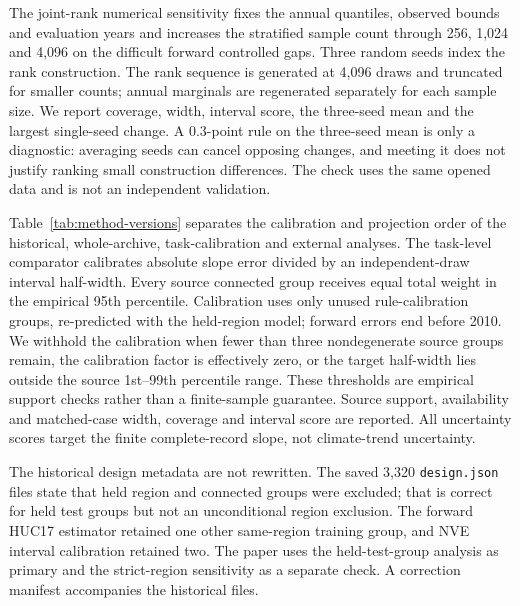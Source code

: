 The joint-rank numerical sensitivity fixes the annual quantiles, observed bounds and evaluation years and increases the stratified sample count through 256, 1,024 and 4,096 on the difficult forward controlled gaps. Three random seeds index the rank construction. The rank sequence is generated at 4,096 draws and truncated for smaller counts; annual marginals are regenerated separately for each sample size. We report coverage, width, interval score, the three-seed mean and the largest single-seed change. A 0.3-point rule on the three-seed mean is only a diagnostic: averaging seeds can cancel opposing changes, and meeting it does not justify ranking small construction differences. The check uses the same opened data and is not an independent validation.

Table~\ref{tab:method-versions} separates the calibration and projection order of the historical, whole-archive, task-calibration and external analyses. The task-level comparator calibrates absolute slope error divided by an independent-draw interval half-width. Every source connected group receives equal total weight in the empirical 95th percentile. Calibration uses only unused rule-calibration groups, re-predicted with the held-region model; forward errors end before 2010. We withhold the calibration when fewer than three nondegenerate source groups remain, the calibration factor is effectively zero, or the target half-width lies outside the source 1st--99th percentile range. These thresholds are empirical support checks rather than a finite-sample guarantee. Source support, availability and matched-case width, coverage and interval score are reported. All uncertainty scores target the finite complete-record slope, not climate-trend uncertainty.

The historical design metadata are not rewritten. The saved 3,320 \texttt{design.json} files state that held region and connected groups were excluded; that is correct for held test groups but not an unconditional region exclusion. The forward HUC17 estimator retained one other same-region training group, and NVE interval calibration retained two. The paper uses the held-test-group analysis as primary and the strict-region sensitivity as a separate check. A correction manifest accompanies the historical files.
